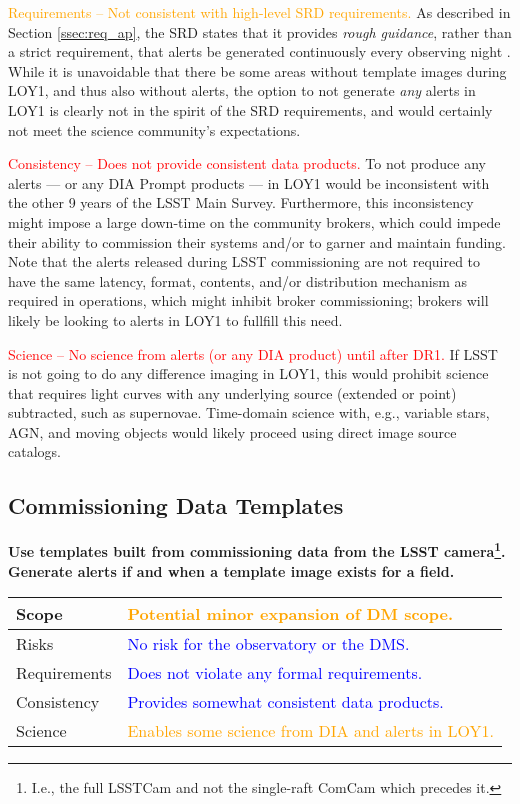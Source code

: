 \documentclass[DM,lsstdraft,toc]{lsstdoc}
\begin{document}
\textcolor{orange}{ Requirements -- Not consistent with high-level SRD requirements.}
As described in Section \ref{ssec:req_ap}, the SRD states that it provides {\it rough guidance}, rather than a strict requirement, that alerts be generated continuously every observing night . 
While it is unavoidable that there be some areas without template images during LOY1, and thus also without alerts, the option to not generate {\it any} alerts in LOY1 is clearly not in the spirit of the SRD requirements, and would certainly not meet the science community's expectations. 

\textcolor{red}{ Consistency -- Does not provide consistent data products.}
To not produce any alerts --- or any DIA Prompt products --- in LOY1 would be inconsistent with the other 9 years of the LSST Main Survey.
Furthermore, this inconsistency might impose a large down-time on the community brokers, which could impede their ability to commission their systems and/or to garner and maintain funding.
Note that the alerts released during LSST commissioning are not required to have the same latency, format, contents, and/or distribution mechanism as required in operations, which might inhibit broker commissioning;  brokers will likely be looking to alerts in LOY1 to fullfill this need.

\textcolor{red}{ Science -- No science from alerts (or any DIA product) until after DR1.}
If LSST is not going to do any difference imaging in LOY1, this would prohibit science that requires light curves with any underlying source (extended or point) subtracted, such as supernovae.
Time-domain science with, e.g., variable stars, AGN, and moving objects would likely proceed using direct image source catalogs. 


\clearpage
\subsection{Commissioning Data Templates}\label{ssec:potsol_comm}

{\bf Use templates built from commissioning data from the LSST camera\footnote{I.e., the full LSSTCam and not the single-raft ComCam which precedes it.}. Generate alerts if and when a template image exists for a field.}

\begin{center}
\begin{tabular}{|p{2.5cm}|p{13cm}|}
\hline
Scope & \textcolor{orange}{Potential minor expansion of DM scope.}   \\
\hline
Risks & \textcolor{blue}{No risk for the observatory or the DMS.} \\
\hline
Requirements & \textcolor{blue}{Does not violate any formal requirements.} \\
\hline
Consistency & \textcolor{blue}{Provides somewhat consistent data products.}  \\
\hline
Science & \textcolor{orange}{Enables some science from DIA and alerts in LOY1.} \\
\hline
\end{tabular}
\end{center}
\end{document}
